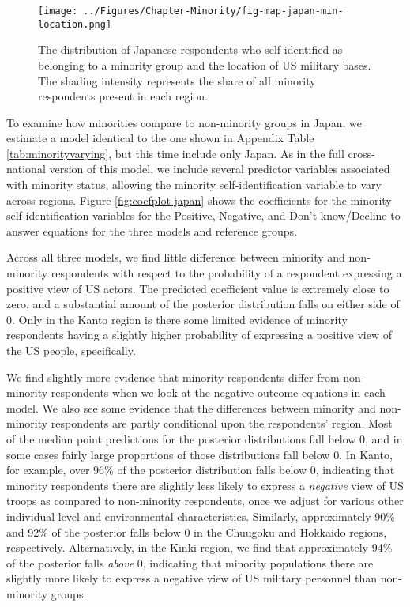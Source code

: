 \begin{figure}[t]
	\centering\texttt{[image: ../Figures/Chapter-Minority/fig-map-japan-min-location.png]}
	\caption{The distribution of Japanese respondents who self-identified as belonging to a minority group and the location of US military bases. The shading intensity represents the share of all minority respondents present in each region.}
	\label{fig:japanminoritymap}
\end{figure}


To examine how minorities compare to non-minority groups in Japan, we estimate a model identical to the one shown in Appendix Table \ref{tab:minorityvarying}, but this time include only Japan. As in the full cross-national version of this model, we include several predictor variables associated with minority status, allowing the minority self-identification variable to vary across regions. Figure \ref{fig:coefplot-japan} shows the coefficients for the minority self-identification variables for the Positive, Negative, and Don't know/Decline to answer equations for the three models and reference groups.

Across all three models, we find little difference between minority and non-minority respondents with respect to the probability of a respondent expressing a positive view of US actors. The predicted coefficient value is extremely close to zero, and a substantial amount of the posterior distribution falls on either side of 0. Only in the Kanto region is there some limited evidence of minority respondents having a slightly higher probability of expressing a positive view of the US people, specifically. 

We find slightly more evidence that minority respondents differ from non-minority respondents when we look at the negative outcome equations in each model. We also see some evidence that the differences between minority and non-minority respondents are partly conditional upon the respondents' region. Most of the median point predictions for the posterior distributions fall below 0, and in some cases fairly large proportions of those distributions fall below 0. In Kanto, for example, over 96\% of the posterior distribution falls below 0, indicating that minority respondents there are slightly less likely to express a \textit{negative} view of US troops as compared to non-minority respondents, once we adjust for various other individual-level and environmental characteristics. Similarly, approximately 90\% and 92\% of the posterior falls below 0 in the Chuugoku and Hokkaido regions, respectively. Alternatively, in the Kinki region, we find that approximately 94\% of the posterior falls \textit{above} 0, indicating that minority populations there are slightly more likely to express a negative view of US military personnel than non-minority groups.



